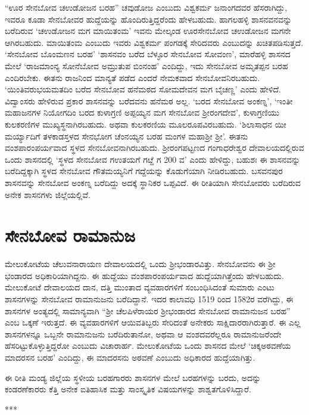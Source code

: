“ಊರ ಸೇನಬೋವ ಚಉಡೋಜನ ಬರಹ” ಚವುಡೋಜ ಎಂಬುದು ವಿಶ್ವಕರ್ಮ ಜನಾಂಗದವರ ಹೆಸರಾಗಿದ್ದು, ಇವರೂ ಕೂಡಾ ಸೇನಬೋವರ ಹುದ್ದೆಯನ್ನು ಹೊಂದಿರುತ್ತಿದ್ದರೆಂದು ಹೇಳಬಹುದು. ಹಾಗಲಹಳ್ಳಿ ಶಾಸನವನವನ್ನು ಬರೆದಿರುವ ‘ಚಉಡೋಜನ ಮಗ ಮಾಯಿತಂಮ’ ಇವನು ಮೇಲ್ಕಂಡ ಊರಸೇನಬೋವ ಚಉಡೋಜನ ಮಗನೇ ಆಗಿರಬಹುದು. ಮಾಯಿತಂಮ ಎಂಬುದು ಇವರು ವಿಶ್ವಕರ್ಮ ಪಂಗಡಕ್ಕೆ ಸೇರಿದವರು ಎಂಬುದನ್ನು ಖಚಿತಪಡಿಸುತ್ತದೆ. ‘ಸೇನಬೋವ ಬೊಂಮಣನ ಬರಹ’ ‘ಶಾಸನವಂ ಬರೆದ ಬೆಳ್ಳೂರ ಸೇನಬೋವ ಸೋವಂಣ’, ಮಾರೆಹಳ್ಳಿ ಶಾಸನದ ಮೇಲೆ ‘ರಾಜಮಾಂನ್ಯ ಸೋನೆಬೋವ ಅಮ್ರುತುಪ ಬಿಂನಂಹ’ ಎಂದಿದ್ದು, ಇದು ಸೇನಬೋವ ಅಮೃತಪ್ಪನ ಬರಹ ಎಂದಿರಬೇಕು. ಈತನು ರಾಜನಿಂದ ಮಾನ್ಯತೆ ಪಡೆದ ಎಂದರೆ ನೇಮಕವಾದ ಸೇನಬೋವನಿರಬಹುದು. ‘ಯಿಂತಿವರುಭಯಮತದಿಂ ಬರೆದ ಸೇನಬೋವ ಹನೆಮಠದ ಸೋಮದೇವನ ಮಗ ಬೈಚಣ್ಣ’ ಎಂದು ಹೇಳಿದೆ. ವಿದ್ವಾಂಸರು ಹೇಳಿರುವ ಪ್ರಕಾರ ಶಾಸನವನ್ನು ಬರೆದವನು ಹನೆಮಠ ಅಲ್ಲ. ‘ಬರದ ಸೇನಬೋವ ಅಂಕಣ್ನ’, ‘ಇಂತೀ ಮಹಾಜನಗಳ ನಿಯೋಗದಿಂ ಬರದ ಕುಳಾಗ್ರಣಿ ಅಪ್ಪಯ್ಯನ ಮಗ ಸೇನಬೋವ ಶ‍್ರೀರಂಗದೇವ’, ಕುಳಾಗ್ರಣಿಯು ಕುಲಕರಣಿಗಳ ಮುಖ್ಯಸ್ಥನಾಗಿರಬಹುದು. ಅಥವಾ ಕುಲಕರಣಿಯ ಮೂಲರೂಪವಿರಬಹುದು. ‘ಶಿಲಾಸಾಧನ ಯೀ ಮರ್ಯ್ಯಾದಿಗೆ ತಳಕಾಡಸ್ತಳದ ಸೇನಭೋಗ ಚೆಂನಯ್ಯನ ಬರಹ ಮಂಗಳ ಮಹಾಶ‍್ರೀ ಶ‍್ರೀ’. ಈತನು ವಂಶಪಾರಂಪರ್ಯವಾದ ಸ್ಥಳದ ಸೇನಬೋವನಾಗಿರಬಹುದು. ಶ‍್ರೀರಂಗಪಟ್ಟಣದ ಗಂಗಾಧರೇಶ್ವರ ದೇವಾಲಯದಲ್ಲಿರುವ ಒಂದು ಶಾಸನದಲ್ಲಿ ‘ಸ್ಥಳದ ಸೇನಬೋವ ಗಉತಯಗೆ ಗೞ್ದೆ ಗ 200 ವ’ ಎಂದು ಹೇಳಿದ್ದು, ಬಹುಶಃ ಈ ಶಾಸನವನ್ನು ಬರೆದಿದ್ದಕ್ಕಾಗಿ ಸ್ಥಳದ ಸೇನಬೋವ ಗೌತಮಯ್ಯನಿಗೆ ಗದ್ದೆಯನ್ನು ಕೊಡುಗೆಯಾಗಿ ನೀಡಿರಬಹುದು. ಬಸವನಪುರ ಶಾಸನವನ್ನು ಸೇನಬೋವ ಅಂಕಣ್ನ ಬರೆದಿದ್ದು ಅದಕ್ಕೆ ಸ್ಥಾನಿಕರ ಒಪ್ಪವಿದೆ. ಈ ರೀತಿಯಾಗಿ ಸೇನಬೋವರು ಬರೆದಿರುವ ಅನೇಕ ಶಾಸನಗಳು ಜಿಲ್ಲೆಯಲ್ಲಿವೆ.


\section*{ಸೇನಬೋವ ರಾಮಾನುಜ}

ಮೇಲುಕೋಟೆಯ ಚೆಲುವನಾರಾಯಣ ದೇವಾಲಯದಲ್ಲಿ ಒಂದು ಶ‍್ರೀಭಂಡಾರವಿತ್ತು. ಸೇನಬೋವನು ಈ ಶ‍್ರೀ ಭಂಡಾರದ ಅಧಿಕಾರಿಯಾಗಿದ್ದನು. ಈ ಹುದ್ದೆಯು ವಂಶಪಾರಂಪರ್ಯವಾದ ಹುದ್ದೆಯಾಗಿತ್ತೆಂದು ಹೇಳಬಹುದು. ಮೇಲುಕೋಟೆ ದೇವಾಲಯದ ದಾನ, ದತ್ತಿ ಮುಂತಾದ ವ್ಯವಹಾರಗಳಿಗೆ ಸಂಬಂಧಿಸಿದಂತೆ ಸುಮಾರು ಎಂಟು ಶಾಸನಗಳನ್ನು ಸೇನಬೋವ ರಾಮಾನುಜನು ಬರೆದಿದ್ದಾನೆ. ಇದರ ಕಾಲಾವಧಿ 1519 ರಿಂದ 1582ರ ವರೆಗಿದ್ದು, ಈ ಶಾಸನಗಳ ಅಂತ್ಯದಲ್ಲಿ ಸಾಮಾನ್ಯವಾಗಿ “ಶ‍್ರೀ ಚೆಲಪಿಳೆರಾಯರ ಶ‍್ರೀಭಂಡಾರದ ಸೇನಬೋವ ರಾಮಾನುಜನ ಬರಹ” ಎಂಬ ಒಕ್ಕಣೆ ಇರುತ್ತದೆ. ಈ ವ್ಯವಹಾರಗಳಿಗೆ ಆಯಿವತಿಬ್ಬರು ಸೇರಿದಂತೆ ಅನೇಕರು ಸಾಕ್ಷಿದಾರರಾಗಿರುತ್ತಾರೆ. ಈ ಎಲ್ಲ ಶಾಸನಗಳನ್ನೂ ಒಬ್ಬನೇ ರಾಮಾನುಜನು ಬರೆದಿರುತಾನೋ, ಅಥವಾ ಆ ವಂಶದವರೆಲ್ಲರೂ ರಾಮಾನುಜರೆಂದೇ ಹೆಸರಿಟ್ಟುಕೊಳ್ಳುತ್ತಿದ್ದರೋ ಎಂಬುದು ವಿಚಾರಾರ್ಹ. ಮೇಲುಕೋಟೆಯ ಒಂದು ಶಾಸನದ ಮೇಲೆ ‘ಚಿಕ್ಕಅಠವಣೆಯ ಮಾದರಸನ ಬರಹ’ ಎಂದಿದ್ದು, ಈ ಮಾದರಸನು ಅಠವಣೆ ಎಂಬುದು ಅಧಿಕಾರದ ಹುದ್ದೆಯಾಗಿತ್ತು.

ಈ ರೀತಿ ಮಂಡ್ಯ ಜಿಲ್ಲೆಯ ಸ್ಥಳೀಯ ಬರಹಗಾರರು ಶಾಸನಗಳ ಮೇಲೆ ಬರಹಗಳನ್ನು ಬರದು, ಅದನ್ನು ಕಂಡರಣೆಕಾರರು ಕೆತ್ತಿ ಅನೇಕ ಐತಿಹಾಸಿಕ ಮತ್ತು ಸಾಂಸ್ಕೃತಿಕ ವಿಷಯಗಳನ್ನು ಶಾಶ್ವತಗೊಳಿಸಿದ್ದಾರೆ.

\begin{center}
***
\end{center}

\theendnotes

